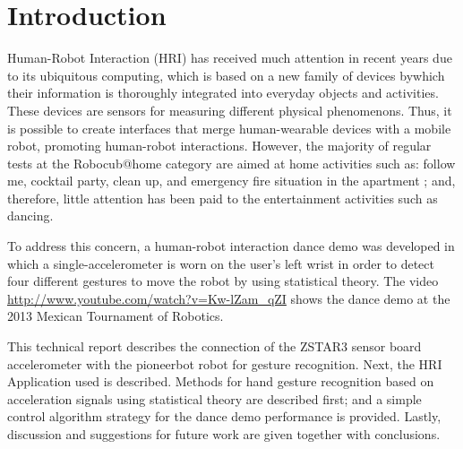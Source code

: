 \chapter{Introduction}


Human-Robot Interaction (HRI) has received much attention in recent years
due to its ubiquitous computing, which is based on a new family of devices 
bywhich their information is thoroughly integrated into everyday objects and activities. 
These devices are sensors for measuring different physical phenomenons.
Thus, it is possible to create interfaces that merge human-wearable devices 
with a mobile robot, promoting human-robot interactions.
However, the majority of regular tests at the Robocub{@}home 
category are aimed at home activities such as: follow me, cocktail party, clean up,
and emergency fire situation in the apartment \cite{robocupathome2013}; and, therefore, 
little attention has been paid to the entertainment activities such as dancing.

To address this concern, a human-robot interaction dance demo was developed 
in which a single-accelerometer is worn on the user's left wrist 
in order to detect four different gestures to move the robot by using statistical theory. 
The video 
\href{http://www.youtube.com/watch?v=Kw-lZam_qZI}{\url{http://www.youtube.com/watch?v=Kw-lZam_qZI}} shows the dance demo at the 2013 Mexican Tournament of Robotics.

This technical report describes the connection of the ZSTAR3 sensor board accelerometer
with the pioneerbot robot for gesture recognition. Next, the HRI Application used is described.
Methods for hand gesture recognition based on acceleration signals using statistical theory are described first;
and a simple control algorithm strategy for the dance demo performance is provided.
Lastly, discussion and suggestions for future work are given together with conclusions.
